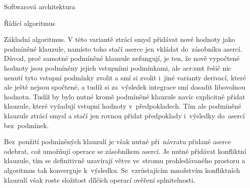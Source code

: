 \documentclass[thesis=M,czech]{FITthesis}[2012/06/26]
\newcommand{\acrlabel}[1]{acr:#1}
\newcommand{\acr}[1]{\acrshort{\acrlabel{#1}}}
\begin{document}
\begin{section}{Softwarová architektura}
\begin{subsection}{Řídící algoritmus}
\begin{paragraph}{Základní algoritmus.}
V této variantě ztrácí smysl přidávat
nové hodnoty jako podmíněné klauzule,
namísto toho stačí aserce jen vkládat do~zásobníku asercí.
Důvod, proč samotné podmíněné klauzule nefungují,
je ten, že nově vypočtené hodnoty
jsou podmíněny jejich vstupními podmínkami,
ale \acr{smt} řešič nic nenutí tyto vstupní podmínky zvolit
a smí si zvolit i~jiné varianty derivací,
které ale ještě nejsou spočtené,
a tudíž si za~výsledek integrace smí dosadit libovolnou hodnotu.
Tudíž by bylo nutné kromě podmíněné klauzule
navíc explicitně přidat klauzule,
které vyžadují vstupní hodnoty v~předpokladech.
Tím ale podmíněné klauzule ztrácí smysl
a stačí jen rovnou přidat předpoklady
i~výsledky do~asercí bez~podmínek.

Bez~použití podmíněných klauzulí
je však nutné při~návratu
přidané aserce odebrat,
což umožňují operace se zásobníkem asercí.
Je nutné přidávat konfliktní klauzule,
tím se definitivně uzavírají větve
ve~stromu prohledávaného prostoru
a algoritmus tak konverguje k~výsledku.
Se~vzrůstajícím množstvím konfliktních klauzulí
však roste složitost dílčích operací ověření splnitelnosti.


\end{paragraph}
\end{subsection}
\end{section}
\end{document}
